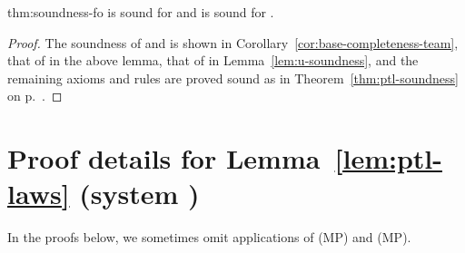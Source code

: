 \documentclass[a4paper,english,fleqn,11pt,final]{scrartcl}
\newcommand{\Deriv}[1]{{\normalfont\textsf{#1}}}
\theoremstyle{plain}
\theoremstyle{definition}
\newcommand{\thm}{\text{\scriptsize\; (thm)}}
\begin{document}
\begin{reptheorem}{thm:soundness-fo}
 is sound for  and  is sound for .
\end{reptheorem}
\begin{proof}
The soundness of  and  is shown in Corollary~\ref{cor:base-completeness-team}, that of  in the above lemma, that of  in Lemma~\ref{lem:u-soundness}, and the remaining axioms and rules are proved sound as in Theorem~\ref{thm:ptl-soundness} on p.~\pageref{p:soundproof}.
\end{proof}
 



\section{Proof details for Lemma~\ref{lem:ptl-laws} (system )}

In the proofs below, we sometimes omit applications of \Deriv{(MP)} and \Deriv{(MP)}.


\renewcommand{\thm}{\text{\tiny\; (thm)}}
\end{document}
